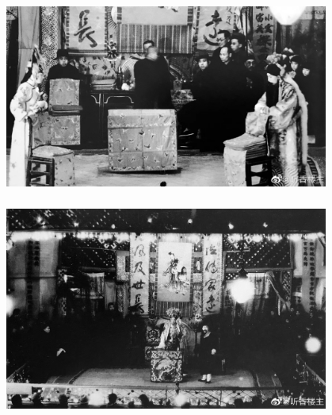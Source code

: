 \documentclass[cjk,slidestop,compress,mathserif,blue]{beamer}
\begin{document}
\frame
{
	\frametitle{}
\begin{figure}[h!]
\centering
\vspace{-0.10in}
\includegraphics[height=0.60\textwidth,width=0.95\textwidth, clip]{Figures_Peking-Opera/PekOpe_His-5.jpg}
\label{History-5}
\end{figure}
}

\frame
{
	\frametitle{}
\begin{figure}[h!]
\centering
\vspace{-0.10in}
\includegraphics[height=0.60\textwidth,width=0.95\textwidth, clip]{Figures_Peking-Opera/PekOpe_His-6.jpg}
\label{History-6}
\end{figure}
}
\end{document}
